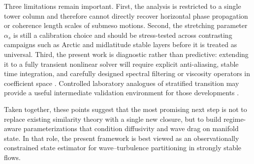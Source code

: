 \documentclass[11pt,a4paper]{article}
\begin{document}
Three limitations remain important. First, the analysis is restricted to a single tower column and therefore cannot directly recover horizontal phase propagation or coherence length scales of submeso motions. Second, the stretching parameter $\alpha_s$ is still a calibration choice and should be stress-tested across contrasting campaigns such as Arctic and midlatitude stable layers before it is treated as universal. Third, the present work is diagnostic rather than predictive: extending it to a fully transient nonlinear solver will require explicit anti-aliasing, stable time integration, and carefully designed spectral filtering or viscosity operators in coefficient space \citep{Halila2019, Kaur2023, Pellegrino2023}. Controlled laboratory analogues of stratified transition may provide a useful intermediate validation environment for those developments \citep{Lefauve2025}.

Taken together, these points suggest that the most promising next step is not to replace existing similarity theory with a single new closure, but to build regime-aware parameterizations that condition diffusivity and wave drag on manifold state. In that role, the present framework is best viewed as an observationally constrained state estimator for wave--turbulence partitioning in strongly stable flows.
\end{document}
